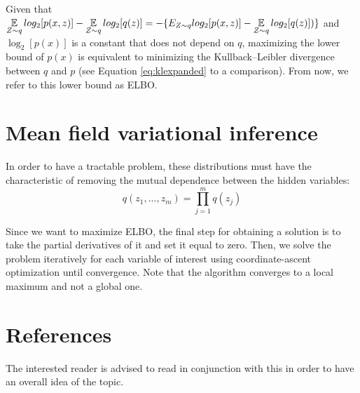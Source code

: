 Given that $ \displaystyle \operatorname*{\mathbb{E}}_{Z \sim q} log_2[p(x,z)] - \operatorname*{\mathbb{E}}_{Z \sim q} log_2[q(z)] = -\{E_{Z \sim q} log_2[p(x,z)] - \operatorname*{\mathbb{E}}_{Z \sim q} log_2[q(z)])\}$
and $\log_2[p(x)]$ is a constant that does not depend on $q$,
maximizing the lower bound of $p(x)$ is equivalent to minimizing the Kullback–Leibler divergence between $q$ and $p$ (see Equation \ref{eq:klexpanded} to a comparison).
From now, we refer to this lower bound as ELBO.

\section{Mean field variational inference}
In order to have a tractable problem, these distributions must have the characteristic
of removing the mutual dependence between the hidden variables:
$$ q(z_1, ..., z_m) = \prod_{j=1}^m q(z_j) $$

Since we want to maximize ELBO,
the final step for obtaining a solution is to take the partial derivatives of it and set it equal to zero.
Then, we solve the problem iteratively for each variable of interest using coordinate-ascent optimization until convergence.
Note that the algorithm converges to a local maximum and not a global one.

\section{References}
The interested reader is advised to read \cite{Blei_2017} in conjunction with this in order to have an overall idea of the topic.